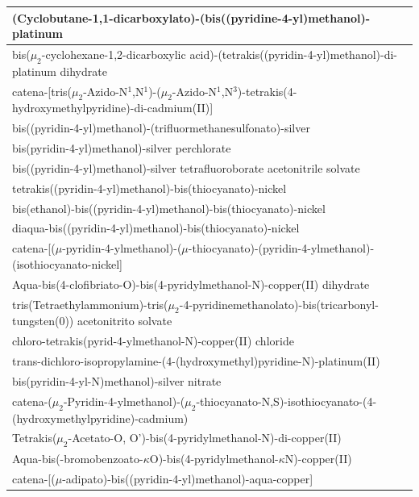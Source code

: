 \begin{longtable}{|p{}|}
\hline
(Cyclobutane-1,1-dicarboxylato)-(bis((pyridine-4-yl)methanol)-platinum \cite{escribano2013}\\
\hline
bis($\mu_2$-cyclohexane-1,2-dicarboxylic acid)-(tetrakis((pyridin-4-yl)methanol)-di-platinum dihydrate \cite{escribano2013}\\
\hline
catena-[tris($\mu_2$-Azido-N$^1$,N$^1$)-($\mu_2$-Azido-N$^1$,N$^3$)-tetrakis(4-hydroxymethylpyridine)-di-cadmium(II)] \cite{goher2008}\\
\hline
bis((pyridin-4-yl)methanol)-(trifluormethanesulfonato)-silver \cite{deBoer2014}\\
\hline
bis(pyridin-4-yl)methanol)-silver perchlorate \cite{deBoer2014}\\
\hline
bis((pyridin-4-yl)methanol)-silver tetrafluoroborate acetonitrile solvate \cite{deBoer2014}\\
\hline
tetrakis((pyridin-4-yl)methanol)-bis(thiocyanato)-nickel \cite{werner2015}\\
\hline
bis(ethanol)-bis((pyridin-4-yl)methanol)-bis(thiocyanato)-nickel \cite{werner2015}\\
\hline
diaqua-bis((pyridin-4-yl)methanol)-bis(thiocyanato)-nickel \cite{werner2015}\\
\hline
catena-[($\mu$-pyridin-4-ylmethanol)-($\mu$-thiocyanato)-(pyridin-4-ylmethanol)-(isothiocyanato-nickel] \cite{werner2015}\\
\hline
Aqua-bis(4-clofibriato-O)-bis(4-pyridylmethanol-N)-copper(II) dihydrate \cite{moncol2004}\\
\hline
tris(Tetraethylammonium)-tris($\mu_2$-4-pyridinemethanolato)-bis(tricarbonyl-tungsten(0)) acetonitrito solvate \cite{klausmeyer2004}\\
\hline
chloro-tetrakis(pyrid-4-ylmethanol-N)-copper(II) chloride \cite{moncol2004}\\
\hline
trans-dichloro-isopropylamine-(4-(hydroxymethyl)pyridine-N)-platinum(II) \cite{ramoslima2006}\\
\hline
bis(pyridin-4-yl-N)methanol)-silver nitrate \cite{deBoer2014}\\
\hline
catena-($\mu_2$-Pyridin-4-ylmethanol)-($\mu_2$-thiocyanato-N,S)-isothiocyanato-(4-(hydroxymethylpyridine)-cadmium) \cite{werneracta}\\
\hline
Tetrakis($\mu_2$-Acetato-O, O')-bis(4-pyridylmethanol-N)-di-copper(II) \cite{hoang1993}\\
\hline
Aqua-bis(-bromobenzoato-$\kappa$O)-bis(4-pyridylmethanol-$\kappa$N)-copper(II) \cite{moncol2008}\\
\hline
catena-[($\mu$-adipato)-bis((pyridin-4-yl)methanol)-aqua-copper] \cite{chechova2015}\\
\hline
\end{longtable}
 
